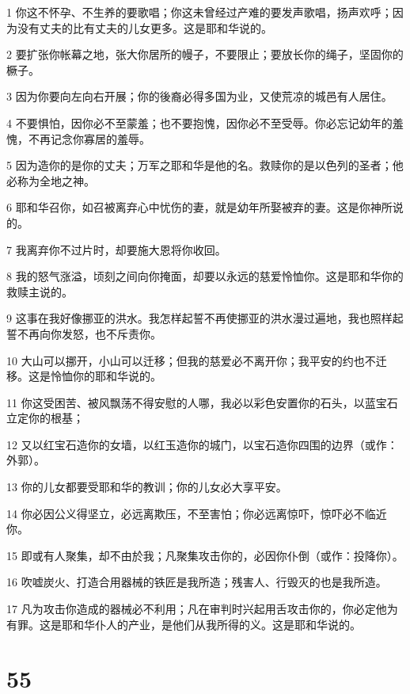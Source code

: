 \par 1 你这不怀孕、不生养的要歌唱；你这未曾经过产难的要发声歌唱，扬声欢呼；因为没有丈夫的比有丈夫的儿女更多。这是耶和华说的。
\par 2 要扩张你帐幕之地，张大你居所的幔子，不要限止；要放长你的绳子，坚固你的橛子。
\par 3 因为你要向左向右开展；你的後裔必得多国为业，又使荒凉的城邑有人居住。
\par 4 不要惧怕，因你必不至蒙羞；也不要抱愧，因你必不至受辱。你必忘记幼年的羞愧，不再记念你寡居的羞辱。
\par 5 因为造你的是你的丈夫；万军之耶和华是他的名。救赎你的是以色列的圣者；他必称为全地之神。
\par 6 耶和华召你，如召被离弃心中忧伤的妻，就是幼年所娶被弃的妻。这是你神所说的。
\par 7 我离弃你不过片时，却要施大恩将你收回。
\par 8 我的怒气涨溢，顷刻之间向你掩面，却要以永远的慈爱怜恤你。这是耶和华你的救赎主说的。
\par 9 这事在我好像挪亚的洪水。我怎样起誓不再使挪亚的洪水漫过遍地，我也照样起誓不再向你发怒，也不斥责你。
\par 10 大山可以挪开，小山可以迁移；但我的慈爱必不离开你；我平安的约也不迁移。这是怜恤你的耶和华说的。
\par 11 你这受困苦、被风飘荡不得安慰的人哪，我必以彩色安置你的石头，以蓝宝石立定你的根基；
\par 12 又以红宝石造你的女墙，以红玉造你的城门，以宝石造你四围的边界（或作：外郭）。
\par 13 你的儿女都要受耶和华的教训；你的儿女必大享平安。
\par 14 你必因公义得坚立，必远离欺压，不至害怕；你必远离惊吓，惊吓必不临近你。
\par 15 即或有人聚集，却不由於我；凡聚集攻击你的，必因你仆倒（或作：投降你）。
\par 16 吹嘘炭火、打造合用器械的铁匠是我所造；残害人、行毁灭的也是我所造。
\par 17 凡为攻击你造成的器械必不利用；凡在审判时兴起用舌攻击你的，你必定他为有罪。这是耶和华仆人的产业，是他们从我所得的义。这是耶和华说的。

\chapter{55}

